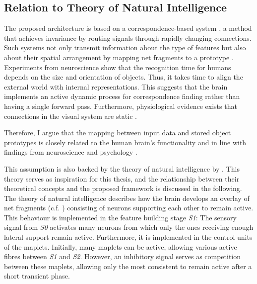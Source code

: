 \subsection{Relation to Theory of Natural Intelligence}
The proposed architecture is based on a correspondence-based system , a method that achieves invariance by routing signals through rapidly changing connections. Such systems not only transmit information about the type of features but also about their spatial arrangement by mapping net fragments to a prototype .
Experiments from neuroscience show that the recognition time for humans depends on the size  and orientation  of objects. Thus, it takes time to align the external world with internal representations.
This suggests that the brain implements an active dynamic process for correspondence finding rather than having a single forward pass.
Furthermore, physiological evidence exists that connections in the visual system are static \cite{kusunoki_time_2003, womelsdorf_dynamic_2006}.

Therefore, I argue that the mapping between input data and stored object prototypes is closely related to the human brain's functionality and in line with findings from neuroscience \cite{kandel_principles_2013, olshausen_emergence_1996, vogels_inhibitory_2011, payeur_burst-dependent_2021} and psychology \cite{ellis_source_1938, kohler_gestalt_1992, wagemans_century_2012, hamlyn_psychology_2017}.

This assumption is also backed by the theory of natural intelligence by .
This theory serves as inspiration for this thesis, and the relationship between their theoretical concepts and the proposed framework is discussed in the following.
The theory of natural intelligence describes how the brain develops an overlay of net fragments (c.f. ) consisting of neurons supporting each other to remain active.
This behaviour is implemented in the feature building stage \emph{S1}: The sensory signal from \emph{S0} activates many neurons from which only the ones receiving enough lateral support remain active. Furthermore, it is implemented in the control units of the maplets. Initially, many maplets can be active, allowing various active fibres between \emph{S1} and \emph{S2}. However, an inhibitory signal serves as competition between these maplets, allowing only the most consistent to remain active after a short transient phase.

